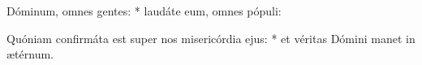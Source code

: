 \begin{psalmus}

 Dóminum, omnes gentes: * laudáte eum, omnes pópuli:
    
Quóniam confirmáta est super nos misericórdia ejus: * et véritas Dómini manet in ætérnum.

\end{psalmus}
